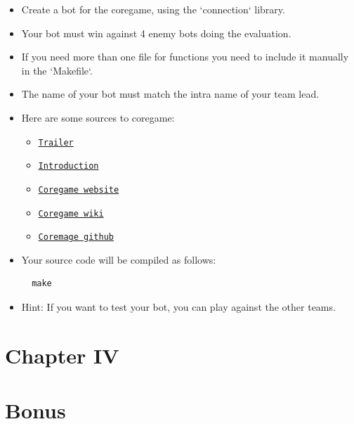 \documentclass[12pt]{article}
\begin{document}
\begin{itemize}
  \item Create a bot for the coregame, using the `connection` library.
  
  \item Your bot must win against 4 enemy bots doing the evaluation.
  
  \item If you need more than one file for functions you need to include it manually in the `Makefile`.
  
  \item The name of your bot must match the intra name of your team lead.
  
  \item Here are some sources to coregame:
  \begin{itemize}
    \item \href{https://youtu.be/gMmBgHnb8Nc?si=Thm0HOCfNIZbfCnI}{\texttt{Trailer}}
    \item \href{https://shattereddisk.github.io/rickroll/rickroll.mp4}{\texttt{Introduction}}
    \item \href{https://coregame.de}{\texttt{Coregame website}}
    \item \href{https://wiki.coregame.de}{\texttt{Coregame wiki}}
    \item \href{https://github.com/42core-team}{\texttt{Coremage github}}
  \end{itemize}
  
  \item Your source code will be compiled as follows:
  
  \begin{verbatim}
  make
  \end{verbatim}
  
  \item Hint: If you want to test your bot, you can play against the other teams.
\end{itemize}

\newpage

\section*{\LARGE Chapter IV}
\section*{\LARGE Bonus}
\end{document}
